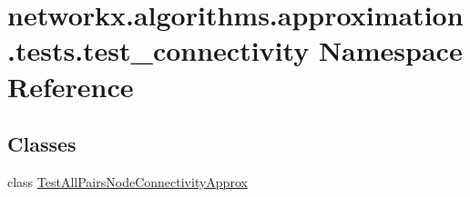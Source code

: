 \hypertarget{namespacenetworkx_1_1algorithms_1_1approximation_1_1tests_1_1test__connectivity}{}\section{networkx.\+algorithms.\+approximation.\+tests.\+test\+\_\+connectivity Namespace Reference}
\label{namespacenetworkx_1_1algorithms_1_1approximation_1_1tests_1_1test__connectivity}
\subsection*{Classes}
\begin{DoxyCompactItemize}
\item 
class \hyperlink{classnetworkx_1_1algorithms_1_1approximation_1_1tests_1_1test__connectivity_1_1TestAllPairsNodeConnectivityApprox}{Test\+All\+Pairs\+Node\+Connectivity\+Approx}
\end{DoxyCompactItemize}
